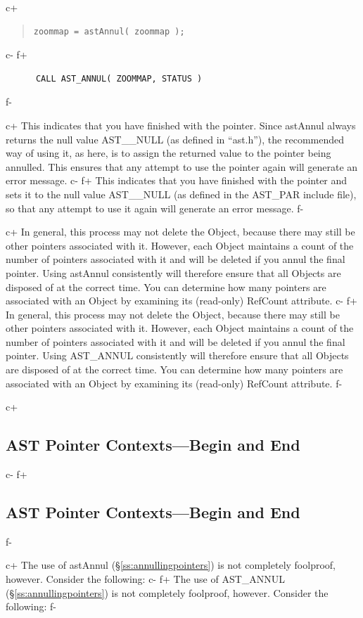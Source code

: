 \documentclass[twoside,11pt]{article}
\newcommand{\secref}[1]{\S\ref{#1}}
\newcommand{\secref}[1]{\ref{#1}}
\begin{document}
c+
\begin{quote}
\small
\begin{verbatim}
zoommap = astAnnul( zoommap );
\end{verbatim}
\normalsize
\end{quote}
c-
f+
\small
\begin{verbatim}
      CALL AST_ANNUL( ZOOMMAP, STATUS )
\end{verbatim}
\normalsize
f-

c+
This indicates that you have finished with the pointer. Since astAnnul
always returns the null value AST\_\_NULL (as defined in ``ast.h''),
the recommended way of using it, as here, is to assign the returned
value to the pointer being annulled. This ensures that any attempt to
use the pointer again will generate an error message.
c-
f+
This indicates that you have finished with the pointer and sets it to
the null value AST\_\_NULL (as defined in the AST\_PAR include file),
so that any attempt to use it again will generate an error message.
f-

c+
In general, this process may not delete the Object, because there may
still be other pointers associated with it. However, each Object
maintains a count of the number of pointers associated with it and
will be deleted if you annul the final pointer. Using astAnnul
consistently will therefore ensure that all Objects are disposed of at
the correct time. You can determine how many pointers are associated
with an Object by examining its (read-only) RefCount attribute.
c-
f+
In general, this process may not delete the Object, because there may
still be other pointers associated with it. However, each Object
maintains a count of the number of pointers associated with it and
will be deleted if you annul the final pointer. Using AST\_ANNUL
consistently will therefore ensure that all Objects are disposed of at
the correct time. You can determine how many pointers are associated
with an Object by examining its (read-only) RefCount attribute.
f-

c+
\subsection{\label{ss:contexts}AST Pointer Contexts---Begin and End}
c-
f+
\subsection{\label{ss:contexts}AST Pointer Contexts---Begin and End}
f-

c+
The use of astAnnul (\secref{ss:annullingpointers}) is not completely
foolproof, however. Consider the following:
c-
f+
The use of AST\_ANNUL (\secref{ss:annullingpointers}) is not completely
foolproof, however. Consider the following:
f-
\end{document}
